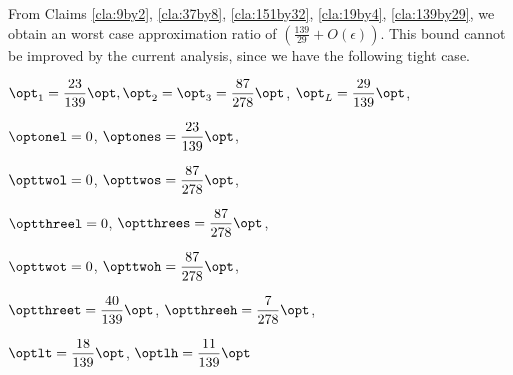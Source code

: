 \begin{enumerate}
    From Claims \ref{cla:9by2}, \ref{cla:37by8}, \ref{cla:151by32}, \ref{cla:19by4}, \ref{cla:139by29}, we obtain an worst case approximation ratio of $\left(\frac{139}{29}+O(\epsilon)\right)$. This bound cannot be improved by the current analysis, since we have the following tight case.

    $\displaystyle\opt_1 = \frac{23}{139}\opt, \opt_2=\opt_3 = \frac{87}{278}\opt$, $\displaystyle\opt_L = \frac{29}{139}\opt$,
    
    $\displaystyle\optonel = 0$, $\displaystyle\optones = \frac{23}{139}\opt$,
    
    $\displaystyle\opttwol = 0$, $\displaystyle\opttwos = \frac{87}{278}\opt$,
    
    $\optthreel = 0$, $\displaystyle\optthrees = \frac{87}{278}\opt$,
    
    $\opttwot = 0$, $\displaystyle\opttwoh = \frac{87}{278}\opt$,
    
    $\displaystyle\optthreet = \frac{40}{139}\opt$, $\displaystyle\optthreeh = \frac{7}{278}\opt$,
    
    $\displaystyle\optlt = \frac{18}{139}\opt$, $\displaystyle\optlh = \frac{11}{139}\opt$






    




\end{enumerate}
